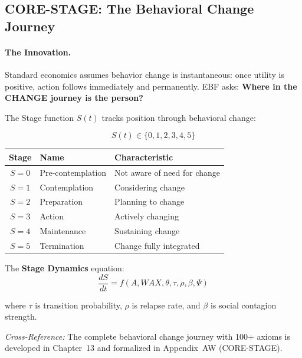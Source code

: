 \subsection{CORE-STAGE: The Behavioral Change Journey}
\label{sec:10c-stage}

\paragraph{The Innovation.}
Standard economics assumes behavior change is instantaneous: once utility is
positive, action follows immediately and permanently. EBF asks:
\textbf{Where in the CHANGE journey is the person?}

The Stage function $S(t)$ tracks position through behavioral change:

\begin{equation}
S(t) \in \{0, 1, 2, 3, 4, 5\}
\end{equation}

\begin{center}
\renewcommand{\arraystretch}{1.2}
\begin{tabular}{@{}cll@{}}
\toprule
\textbf{Stage} & \textbf{Name} & \textbf{Characteristic} \\
\midrule
$S = 0$ & Pre-contemplation & Not aware of need for change \\
$S = 1$ & Contemplation & Considering change \\
$S = 2$ & Preparation & Planning to change \\
$S = 3$ & Action & Actively changing \\
$S = 4$ & Maintenance & Sustaining change \\
$S = 5$ & Termination & Change fully integrated \\
\bottomrule
\end{tabular}
\end{center}

The \textbf{Stage Dynamics} equation:
\begin{equation}
\frac{dS}{dt} = f(A, WAX, \theta, \tau, \rho, \beta, \Psi)
\end{equation}

where $\tau$ is transition probability, $\rho$ is relapse rate, and $\beta$
is social contagion strength.

\textit{Cross-Reference:} The complete behavioral change journey with 100+ axioms is
developed in Chapter~13 and formalized in Appendix~AW (CORE-STAGE).

